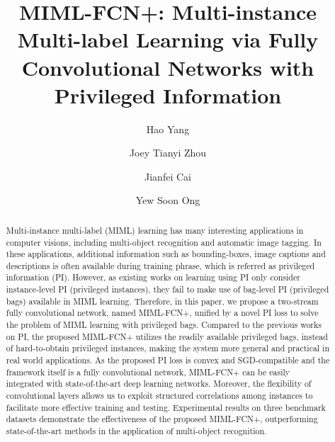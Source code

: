 \documentclass[10pt,twocolumn,letterpaper]{article}
\begin{document}
\title{MIML-FCN+: Multi-instance Multi-label Learning via Fully Convolutional Networks with Privileged Information}

\author[*]{Hao Yang}
\author[**]{Joey Tianyi Zhou}
\author[*]{Jianfei Cai}
\author[*]{Yew Soon Ong}




\maketitle

\begin{abstract}
	
	Multi-instance multi-label (MIML) learning has many interesting
	applications in computer visions, including multi-object
	recognition and automatic image tagging. In these applications,
	additional information such as bounding-boxes, image captions and
	descriptions is often available during training phrase, which is
	referred as privileged information (PI). However, as existing
	works on learning using PI only consider instance-level PI
	(privileged instances), they fail to make use of bag-level PI
	(privileged bags) available in MIML learning. Therefore, in this
	paper, we propose a two-stream fully convolutional network, named
	\textsc{MIML-FCN+}, unified by a novel PI loss to solve the
	problem of MIML learning with privileged bags. Compared to the
	previous works on PI, the proposed \textsc{MIML-FCN+} utilizes the
	readily available privileged bags, instead of hard-to-obtain
	privileged instances, making the system more general and practical
	in real world applications. As the proposed PI loss is convex and
	SGD-compatible and the framework itself is a fully convolutional
	network, \textsc{MIML-FCN+} can be easily integrated with
	state-of-the-art deep learning networks. Moreover, the flexibility
	of convolutional layers allows us to exploit structured
	correlations among instances to facilitate more effective training
	and testing. Experimental results on three benchmark datasets
	demonstrate the effectiveness of the proposed \textsc{MIML-FCN+},
	outperforming state-of-the-art methods in the application of
	multi-object recognition.
\end{abstract}
\end{document}

